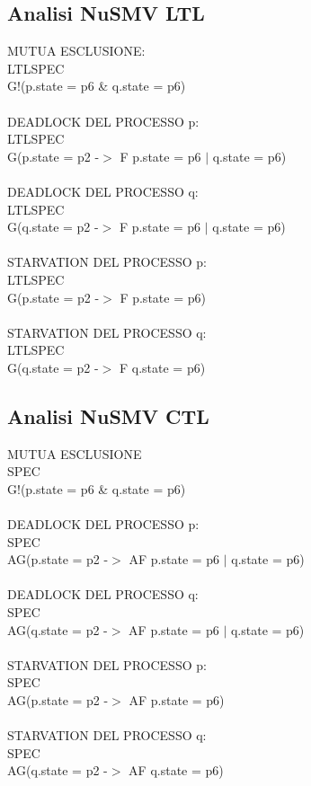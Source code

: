 \documentclass{article}
\begin{document}
\subsection{Analisi NuSMV LTL}
MUTUA ESCLUSIONE:
\\LTLSPEC
\\G!(p.state = p6 \& q.state = p6)
\\\\DEADLOCK DEL PROCESSO p:
\\LTLSPEC
\\G(p.state = p2 -$>$ F p.state = p6 $|$ q.state = p6)
\\\\DEADLOCK DEL PROCESSO q:
\\LTLSPEC
\\G(q.state = p2 -$>$ F p.state = p6 $|$ q.state = p6)
\\\\STARVATION DEL PROCESSO p:
\\LTLSPEC
\\G(p.state = p2 -$>$ F p.state = p6)
\\\\STARVATION DEL PROCESSO q:
\\LTLSPEC
\\G(q.state = p2 -$>$ F q.state = p6)
\subsection{Analisi NuSMV CTL}
MUTUA ESCLUSIONE
\\SPEC
\\G!(p.state = p6 \& q.state = p6)
\\\\DEADLOCK DEL PROCESSO p:
\\SPEC
\\AG(p.state = p2 -$>$ AF p.state = p6 $|$ q.state = p6)
\\\\DEADLOCK DEL PROCESSO q:
\\SPEC
\\AG(q.state = p2 -$>$ AF p.state = p6 $|$ q.state = p6)
\\\\STARVATION DEL PROCESSO p:
\\SPEC
\\AG(p.state = p2 -$>$ AF p.state = p6)
\\\\STARVATION DEL PROCESSO q:
\\SPEC
\\AG(q.state = p2 -$>$ AF q.state = p6)
\end{document}
